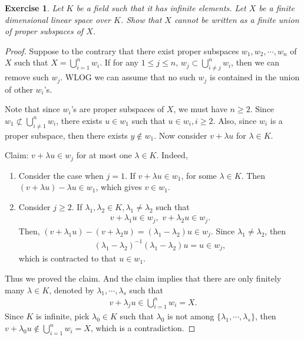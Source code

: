 \documentclass[11pt]{book}
\newtheorem{exercise}{Exercise}[section]
\theoremstyle{definition}
\numberwithin{equation}{chapter}
\begin{document}
\medskip

\begin{exercise}
Let $K$ be a field such that it has infinite elements. Let $X$ be a finite dimensional linear space over $K$. Show that $X$ cannot be written as a finite union of proper subspaces of $X$.
\end{exercise}
\begin{proof}
Suppose to the contrary that there exist proper subspaces $w_1, w_2, \cdots, w_n$ of $X$ such that $X = \bigcup^n_{i=1}w_i$. If for any $1 \leq j \leq n$, $w_j \subset \bigcup^n_{i\neq j}w_i$, then we can remove such $w_j$. WLOG we can assume that no such $w_j$ is contained in the union of other $w_i$'s. 

Note that since $w_i$'s are proper subspaces of $X$, we must have $n \geq 2$. Since $w_1 \not\subset \bigcup^n_{i\neq 1}w_i$, there exists $u \in w_1$ such that $u \in w_i, i \geq 2$. Also, since $w_i$ is a proper subspace, then there exists $y \notin w_1$. Now consider $v + \lambda u$ for $\lambda \in K$.

Claim: $v + \lambda u \in w_j$ for at most one $\lambda \in K$. Indeed,
\begin{enumerate}[label=(\alph*)]
    \item Consider the case when $j = 1$. If $v + \lambda u \in w_1$, for some $\lambda \in K$. Then $(v + \lambda u) - \lambda u \in w_1$, which gives $v \in w_1$. 
    
    \item Consider $j \geq 2$. If $\lambda_1, \lambda_2 \in K, \lambda_1 \neq \lambda_2$ such that 
    \begin{align*}
        v + \lambda_1 u \in w_j, \,\, v + \lambda_2 u \in w_j.
    \end{align*}
    Then, $\left(v + \lambda_1 u\right) - \left(v + \lambda_2 u\right) = \left(\lambda_1 - \lambda_2\right)u \in w_j$. Since $\lambda_1 \neq \lambda_2$, then 
    \begin{align*}
        \left(\lambda_1 - \lambda_2\right)^{-1}\left(\lambda_1 - \lambda_2\right) u = u \in w_j,
    \end{align*}
    which is contracted to that $u \in w_1$.
\end{enumerate}
Thus we proved the claim. And the claim implies that there are only finitely many $\lambda \in K$, denoted by $\lambda_1, \cdots, \lambda_s$ such that
\begin{align*}
    v + \lambda_j u \in \bigcup^n_{i=1}w_i = X.
\end{align*}
Since $K$ is infinite, pick $\lambda_0 \in K$ such that $\lambda_0$ is not among $\{\lambda_1, \cdots, \lambda_s\}$, then $v + \lambda_0 u \notin \bigcup^n_{i=1}w_i = X$, which is a contradiction.
\end{proof}
\end{document}
